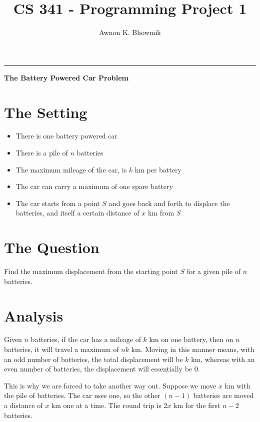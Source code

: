 \documentclass[a4paper, 12pt]{article}
\title{CS 341 - Programming Project 1}
\author{Awnon K. Bhowmik}
\begin{document}
\maketitle
\noindent\rule{\textwidth}{1pt}
\textbf{The Battery Powered Car Problem}

\section*{The Setting}
\begin{itemize}
	\item There is one battery powered car
	\item There is a pile of $n$ batteries
	\item The maximum mileage of the car, is $k$ km per battery
	\item The car can carry a maximum of one spare battery
	\item The car starts from a point $S$ and goes back and forth to displace the batteries, and itself a certain distance of $x$ km from $S$
\end{itemize}

\section*{The Question}
	Find the maximum displacement from the starting point $S$ for a given pile of $n$ batteries.
	
\section*{Analysis}
\begin{flushleft}
Given $n$ batteries, if the car has a mileage of $k$ km on one battery, then on $n$ batteries, it will travel a maximum of $nk$ km. Moving in this manner means, with an odd number of batteries, the total displacement will be $k$ km, whereas with an even number of batteries, the displacement will essentially be $0$.
\end{flushleft}

\begin{flushleft}
This is why we are forced to take another way out. Suppose we move $x$ km with the pile of batteries. The car uses one, so the other $(n-1)$ batteries are moved a distance of $x$ km one at a time. The round trip is $2x$ km for the first $n-2$ batteries.
\end{flushleft}
\end{document}
